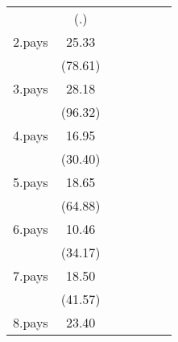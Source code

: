 {\begin{tabular}{l*{6}{c}}
                    &         (.)         &                     &                     &                     &                     &                     \\
[1em]
2.pays              &       25.33\sym{***}&                     &                     &                     &                     &                     \\
                    &     (78.61)         &                     &                     &                     &                     &                     \\
[1em]
3.pays              &       28.18\sym{***}&                     &                     &                     &                     &                     \\
                    &     (96.32)         &                     &                     &                     &                     &                     \\
[1em]
4.pays              &       16.95\sym{***}&                     &                     &                     &                     &                     \\
                    &     (30.40)         &                     &                     &                     &                     &                     \\
[1em]
5.pays              &       18.65\sym{***}&                     &                     &                     &                     &                     \\
                    &     (64.88)         &                     &                     &                     &                     &                     \\
[1em]
6.pays              &       10.46\sym{***}&                     &                     &                     &                     &                     \\
                    &     (34.17)         &                     &                     &                     &                     &                     \\
[1em]
7.pays              &       18.50\sym{***}&                     &                     &                     &                     &                     \\
                    &     (41.57)         &                     &                     &                     &                     &                     \\
[1em]
8.pays              &       23.40\sym{***}&                     &                     &                     &                     &                     \\

\end{tabular}}
